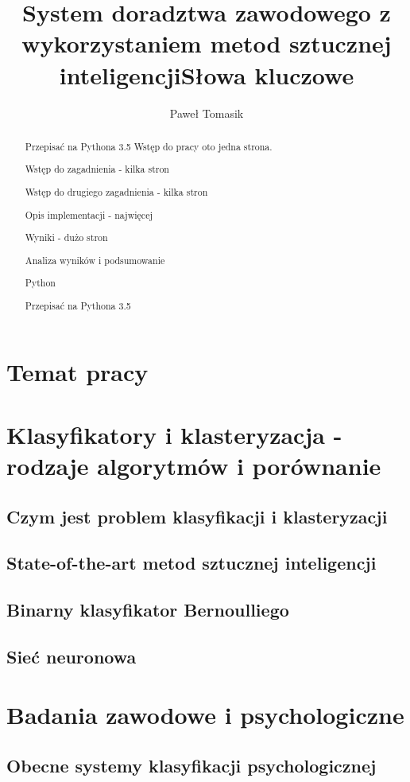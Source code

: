 \documentclass[12pt,a4paper,oneside]{report} %
\title{System doradztwa zawodowego z wykorzystaniem metod sztucznej inteligencji}
\author{Paweł Tomasik}
\begin{document}
\maketitle
\begin{abstract}
Przepisać na Pythona 3.5
Wstęp do pracy oto jedna strona.\par
Wstęp do zagadnienia - kilka stron \par
Wstęp do drugiego zagadnienia - kilka stron \par
Opis implementacji - najwięcej \par
Wyniki - dużo stron\par
Analiza wyników i podsumowanie \par
\title{Słowa kluczowe}
Python
\end{abstract}
\renewcommand{\abstractname}{Strzeszczenie}
\begin{abstract}
Przepisać na Pythona 3.5
\end{abstract}

\tableofcontents

\section{Temat pracy}

\section{Klasyfikatory i klasteryzacja - rodzaje algorytmów i porównanie}
\subsection{Czym jest problem klasyfikacji i klasteryzacji}
\subsection{State-of-the-art metod sztucznej inteligencji}
\subsection{Binarny klasyfikator Bernoulliego}
\subsection{Sieć neuronowa}
\section{Badania zawodowe i psychologiczne}
\subsection{Obecne systemy klasyfikacji psychologicznej}
\end{document}
